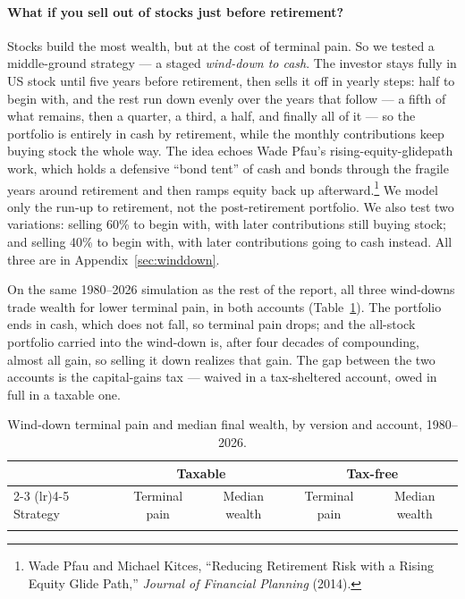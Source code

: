 \documentclass[11pt]{article}
\begin{document}
\paragraph{What if you sell out of stocks just before retirement?} Stocks build the most
wealth, but at the cost of terminal pain. So we tested a middle-ground strategy ---
a staged \emph{wind-down to cash}. The investor stays fully in US stock until five years before
retirement, then sells it off in yearly steps: half to begin with, and the rest run down evenly over
the years that follow --- a fifth of what remains, then a quarter, a third, a half, and finally all of
it --- so the portfolio is entirely in cash by retirement, while the monthly contributions keep buying
stock the whole way. The idea echoes Wade Pfau's
rising-equity-glidepath work,
which holds a defensive ``bond tent'' of cash and bonds through the fragile years around retirement
and then ramps equity back up afterward.\footnote{Wade Pfau and Michael Kitces, ``Reducing Retirement
Risk with a Rising Equity Glide Path,'' \emph{Journal of Financial Planning} (2014).} We model only
the run-up to retirement, not the post-retirement portfolio. We also test two variations: selling 60\%
to begin with, with later contributions still buying stock; and selling 40\% to begin with, with later
contributions going to cash instead. All three are in Appendix~\ref{sec:winddown}.

On the same 1980--2026 simulation as the rest of the report, all three wind-downs trade wealth for
lower terminal pain, in both accounts (Table~\ref{tab:winddown}). The portfolio ends in cash, which does
not fall, so terminal pain drops; and the all-stock portfolio carried into the wind-down is, after four
decades of compounding, almost all gain, so selling it down realizes that gain. The gap between the two
accounts is the capital-gains tax --- waived in a tax-sheltered account, owed in full in a taxable one.

\begin{table}[h]
\centering
\caption{Wind-down terminal pain and median final wealth, by version and account, 1980--2026.}
\label{tab:winddown}
{\small\begin{tabular}{@{}lcccc@{}}
\toprule
 & \multicolumn{2}{c}{Taxable} & \multicolumn{2}{c}{Tax-free} \\
\cmidrule(lr){2-3} \cmidrule(lr){4-5}
Strategy & Terminal pain & Median wealth & Terminal pain & Median wealth \\
\midrule
\\
\bottomrule
\end{tabular}}
\end{table}
\end{document}
